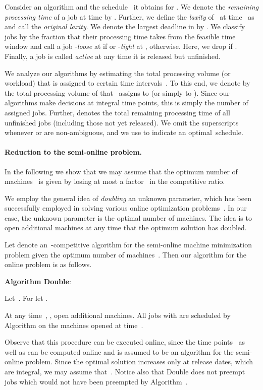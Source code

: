 \documentclass[letterpaper,11pt]{article}
\newcommand{\double}{{\sf Double}\xspace}
\begin{document}
Consider an algorithm  and the schedule~ it obtains for . We denote the {\em remaining processing time} of a job  at time  by . Further, we define the {\em laxity} of~ at time~ as~ and call  the {\em original laxity}. We denote the largest deadline in  by . We classify jobs by the fraction that their processing time takes from the feasible time window and call a job  -{\em loose} at  if  or -{\em tight} at , otherwise. Here, we drop  if . 
Finally, a job is called {\em active} at any time it is released but unfinished.

We analyze our algorithms by estimating the total processing volume (or workload) that is assigned to certain time intervals~. To this end, we denote by  the total processing volume of  that~ assigns to  (or simply to ). Since our algorithms make decisions at integral time points, this is simply the number of assigned jobs. Further,  denotes the total remaining processing time of all unfinished jobs (including those not yet released). We omit the superscripts whenever  or  are non-ambiguous, and we use  to indicate an optimal~schedule.


\paragraph{Reduction to the semi-online problem.} In the following we show that we may assume that the optimum number of
machines~ is given by losing at most a factor~ in the competitive ratio. 


We employ the general idea of {\em doubling} an unknown parameter,
which has been successfully employed in solving various online optimization
problems~\cite{chrobakK06}. In our case, the unknown parameter is
the optimal number of machines. The idea is to open additional
machines at any time that the optimum solution has doubled.

Let  denote an~-competitive algorithm for the
semi-online machine minimization problem given the optimum number of
machines~. Then our algorithm for the online problem is as follows.

\medskip
{\bf Algorithm \double}: 
\begin{compactitem}
\item Let~. 
  For  let . 
\item At any time~, , open  additional machines. All jobs with 
  are scheduled by Algorithm   on the
  machines opened at time~.
\end{compactitem}
\medskip

Observe that this procedure can be executed online, since the time
points~ as well as  can be computed online and
 is assumed to be an algorithm for the semi-online problem. Since
the optimal solution increases only at release dates, which are
integral, we may assume that~. Notice also that \double does
not preempt jobs which would not have been preempted by Algorithm~.
\end{document}
